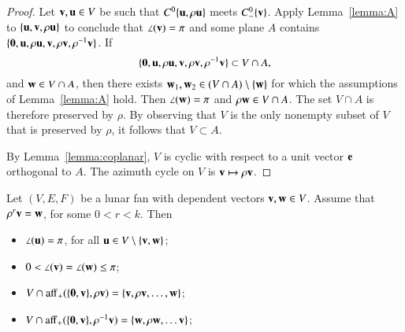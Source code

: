 \begin{proof}  Let ${\mathbf v}, {\mathbf u}\in V$ be such that $C^0\{{\mathbf u},\rho {\mathbf u}\}$ meets $C^0_-\{{\mathbf v}\}$.  Apply
Lemma~\ref{lemma:A} to $\{{\mathbf u},{\mathbf v},\rho {\mathbf u}\}$ to conclude that $\angle({\mathbf v})=\pi$ and some plane $A$ contains
$\{{\mathbf 0},{\mathbf u},\rho{\mathbf u},{\mathbf v},\rho {\mathbf v},\rho^{-1} {\mathbf v}\}$.  If 
$$
\{{\mathbf 0},{\mathbf u},\rho {\mathbf u},{\mathbf v},\rho {\mathbf v},\rho^{-1} {\mathbf v}\} \subset V\cap A,
$$
and ${\mathbf w}\in V\cap A$, then there exists ${\mathbf w}_1,{\mathbf w}_2\in (V\cap A)\setminus\{{\mathbf w}\}$ for which
the assumptions of Lemma~\ref{lemma:A} hold.  Then $\angle({\mathbf w})=\pi$ and
$\rho {\mathbf w} \in V\cap A$.  The set $V\cap A$ is therefore preserved by $\rho$.
By observing that $V$ is the only nonempty subset of $V$ that is preserved by $\rho$,
 it follows that $V\subset A$.  


By Lemma~\ref{lemma:coplanar}, $V$ is cyclic with respect to a unit vector ${\mathbf e}$ orthogonal to $A$.  The
azimuth cycle on $V$ is ${\mathbf v} \mapsto \rho {\mathbf v}$.
%
\end{proof}

\begin{lemma}\label{lemma:lunar}
Let $(V,E,F)$ be a lunar fan with dependent vectors ${\mathbf v},{\mathbf w}\in V$.  
Assume that $\rho^r {\mathbf v} = {\mathbf w}$, for
some $0< r < k$.
Then
\begin{itemize}
\item $\angle({\mathbf u}) = \pi$, for all ${\mathbf u}\in V\setminus \{{\mathbf v},{\mathbf w}\}$; \vspace{3pt}
\item $0< \angle({\mathbf v}) = \angle({\mathbf w})\le \pi$; \vspace{3pt}
\item $V\cap {\operatorname{aff}}_+(\{{\mathbf 0},{\mathbf v}\},\rho {\mathbf v}) = \{{\mathbf v},\rho {\mathbf v},\ldots, {\mathbf w}\}$; \vspace{3pt}
\item $V \cap {\operatorname{aff}}_+(\{{\mathbf 0},{\mathbf v}\},\rho^{-1} {\mathbf v}) = \{{\mathbf w},\rho {\mathbf w},\ldots {\mathbf v}\}$;  \vspace{3pt}
\end{itemize}
\end{lemma}

